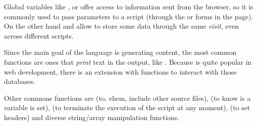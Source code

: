 Global variables like ,  or  offer access to information sent from the browser, so it is commonly used to pass parameters to a  script (through the  or forms in the page).
On the other hand  and  allow to store some data through the same \emph{visit}, even across different scripts.

Since the main goal of the language is generating  content, the most common functions are ones that \emph{print} text in the output, like .
Because  is quite popular in web development, there is an extension with functions to interact with those databases.

Other commons functions are  (to, ehem, include other  source files),  (to know is a variable is set),  (to terminate the execution of the script at any moment),  (to set  headers) and diverse string/array manipulation functions.


